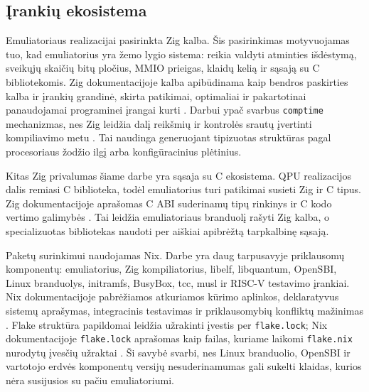 \subsection{Įrankių ekosistema}
\label{subsec:irankiu-ekosistema}

Emuliatoriaus realizacijai pasirinkta Zig kalba. Šis pasirinkimas motyvuojamas tuo, kad emuliatorius yra žemo lygio sistema: reikia valdyti atminties išdėstymą, sveikųjų skaičių bitų pločius, MMIO prieigas, klaidų kelią ir sąsają su C bibliotekomis. Zig dokumentacijoje kalba apibūdinama kaip bendros paskirties kalba ir įrankių grandinė, skirta patikimai, optimaliai ir pakartotinai panaudojamai programinei įrangai kurti \cite{zig-language-reference}. Darbui ypač svarbus \texttt{comptime} mechanizmas, nes Zig leidžia dalį reikšmių ir kontrolės srautų įvertinti kompiliavimo metu \cite{zig-language-reference}. Tai naudinga generuojant tipizuotas struktūras pagal procesoriaus žodžio ilgį arba konfigūracinius plėtinius.

Kitas Zig privalumas šiame darbe yra sąsaja su C ekosistema. QPU realizacijos dalis remiasi C biblioteka, todėl emuliatorius turi patikimai susieti Zig ir C tipus. Zig dokumentacijoje aprašomas C ABI suderinamų tipų rinkinys ir C kodo vertimo galimybės \cite{zig-language-reference}. Tai leidžia emuliatoriaus branduolį rašyti Zig kalba, o specializuotas bibliotekas naudoti per aiškiai apibrėžtą tarpkalbinę sąsają.

Paketų surinkimui naudojamas Nix. Darbe yra daug tarpusavyje priklausomų komponentų: emuliatorius, Zig kompiliatorius, libelf, libquantum, OpenSBI, Linux branduolys, initramfs, BusyBox, tcc, musl ir RISC-V testavimo įrankiai. Nix dokumentacijoje pabrėžiamos atkuriamos kūrimo aplinkos, deklaratyvus sistemų aprašymas, integracinis testavimas ir priklausomybių konfliktų mažinimas \cite{nix-dev}. Flake struktūra papildomai leidžia užrakinti įvestis per \texttt{flake.lock}; Nix dokumentacijoje \texttt{flake.lock} aprašomas kaip failas, kuriame laikomi \texttt{flake.nix} nurodytų įvesčių užraktai \cite{nix-flake-lock}. Ši savybė svarbi, nes Linux branduolio, OpenSBI ir vartotojo erdvės komponentų versijų nesuderinamumas gali sukelti klaidas, kurios nėra susijusios su pačiu emuliatoriumi.
